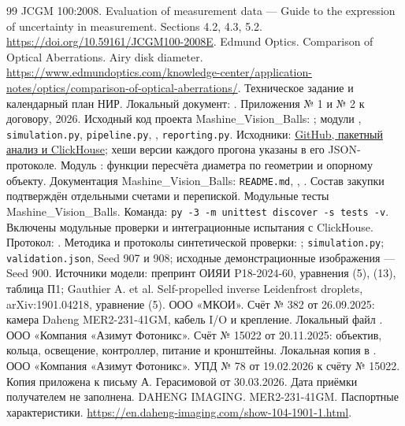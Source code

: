 \documentclass[12pt,a4paper]{article}
\begin{document}
\begin{thebibliography}{99}
 JCGM 100:2008. Evaluation of measurement data --- Guide to the expression of uncertainty in measurement. Sections 4.2, 4.3, 5.2. \url{https://doi.org/10.59161/JCGM100-2008E}.
 Edmund Optics. Comparison of Optical Aberrations. Airy disk diameter. \url{https://www.edmundoptics.com/knowledge-center/application-notes/optics/comparison-of-optical-aberrations/}.
 Техническое задание и календарный план НИР. Локальный документ: . Приложения № 1 и № 2 к договору, 2026.
 Исходный код проекта Mashine\_Vision\_Balls: ; модули , \texttt{simulation.py}, \texttt{pipeline.py}, , \texttt{reporting.py}.  Исходники: \href{https://github.com/TryDotAtwo/Mashine_Vision_Balls/tree/codex/offline-analysis-clickhouse-report-20260930/python_analysis}{GitHub, пакетный анализ и ClickHouse}; хеши версии каждого прогона указаны в его JSON-протоколе.
 Модуль : функции пересчёта диаметра по геометрии и опорному объекту.
 Документация Mashine\_Vision\_Balls: \texttt{README.md}, , . Состав закупки подтверждён отдельными счетами и перепиской.
 Модульные тесты Mashine\_Vision\_Balls. Команда: \texttt{py -3 -m unittest discover -s tests -v}. Включены модульные проверки и интеграционные испытания с ClickHouse. Протокол: .
 Методика и протоколы синтетической проверки: ; \texttt{simulation.py}; \texttt{validation.json}, Seed 907 и 908; исходные демонстрационные изображения --- Seed 900. Источники модели: препринт ОИЯИ P18-2024-60, уравнения (5), (13), таблица П1; Gauthier A. et al. Self-propelled inverse Leidenfrost droplets, arXiv:1901.04218, уравнение (5).
 ООО «МКОИ». Счёт № 382 от 26.09.2025: камера Daheng MER2-231-41GM, кабель I/O и крепление. Локальный файл .
 ООО «Компания «Азимут Фотоникс». Счёт № 15022 от 20.11.2025: объектив, кольца, освещение, контроллер, питание и кронштейны. Локальная копия в .
 ООО «Компания «Азимут Фотоникс». УПД № 78 от 19.02.2026 к счёту № 15022. Копия приложена к письму А. Герасимовой от 30.03.2026. Дата приёмки получателем не заполнена.
 DAHENG IMAGING. MER2-231-41GM. Паспортные характеристики. \url{https://en.daheng-imaging.com/show-104-1901-1.html}.

\end{thebibliography}
\end{document}
